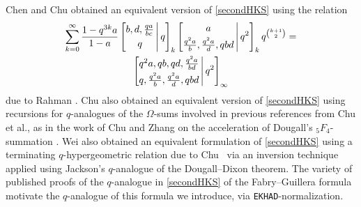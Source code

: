 \documentclass[12pt]{article}
\begin{document}
 Chen and Chu \cite{ChenChu2021} obtained an equivalent version of \eqref{secondHKS} using the relation 
\begin{multline*}
 \sum_{k=0}^{\infty} 
 \frac{1-q^{3k}a}{1-a} 
 \left[ \begin{matrix} 
 b, d, \frac{qa}{bc} \vspace{1mm} \\ 
 q \end{matrix} \, \Bigg| \, q \right]_{k} 
 \left[ \begin{matrix} 
 a \vspace{1mm} \\ 
 \frac{q^2 a}{b}, \frac{q^2a}{d}, q b d \end{matrix} \, \Bigg| \, q^{2} \right]_{k} q^{\binom{k+1}{2}} 
 = \\ 
 \left[ \begin{matrix} 
 q^2 a, qb, qd, \frac{q^2a}{bd} \vspace{1mm} \\ 
 q, \frac{q^2a}{b}, \frac{q^2 a}{d}, q b d \end{matrix} \, \Bigg| \, q^{2} \right]_{\infty} 
\end{multline*}
 due to Rahman \cite{Rahman1993}. 
 Chu \cite{Chu2018} also obtained an equivalent version of 
 \eqref{secondHKS} 
 using recursions for $q$-analogues of the $\Omega$-sums 
 involved in previous references from Chu et al., 
 as in the work of Chu and Zhang on the acceleration of Dougall's ${}_{5}F_{4}$-summation
 \cite{ChuZhang2014}. 
 Wei \cite{Wei2020} also obtained an equivalent formulation of 
 \eqref{secondHKS} 
 using a terminating $q$-hypergeometric relation due to Chu~\cite{Chu1995} 
 via an inversion technique applied using Jackson's $q$-analogue 
 of the Dougall--Dixon theorem. 
 The variety of published proofs of the $q$-analogue 
 in \eqref{secondHKS} 
 of the Fabry--Guillera formula
 motivate the $q$-analogue of this formula we introduce, 
 via {\tt EKHAD}-normalization. 
 
\end{document}
